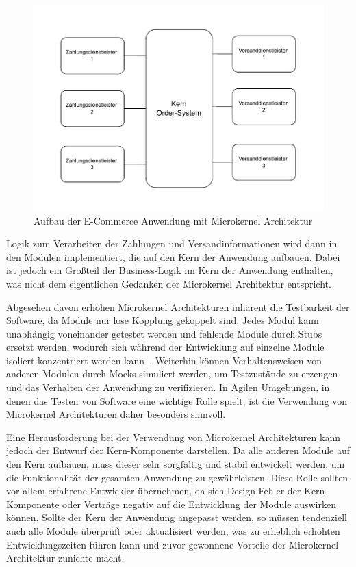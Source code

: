 \documentclass[acmtog]{acmart}
\begin{document}
\begin{figure}[!h]
  \centering
  \includegraphics[width=\linewidth]{images/microkernel/ecommerce-mikrokernel}
  \caption{Aufbau der E-Commerce Anwendung mit Microkernel Architektur}
  \label{fig:ecommerce-microkernel}
\end{figure}

Logik zum Verarbeiten der Zahlungen und Versandinformationen wird dann in den Modulen implementiert, die auf den Kern der Anwendung aufbauen.
Dabei ist jedoch ein Großteil der Business-Logik im Kern der Anwendung enthalten, was nicht dem eigentlichen Gedanken der Microkernel Architektur entspricht.

Abgesehen davon erhöhen Microkernel Architekturen inhärent die Testbarkeit der Software, da Module nur lose Kopplung gekoppelt sind.
Jedes Modul kann unabhängig voneinander getestet werden und fehlende Module durch Stubs ersetzt werden, wodurch sich während der Entwicklung auf einzelne Module isoliert konzentriert werden kann~\cite[26]{architecturePatterns}.
Weiterhin können Verhaltensweisen von anderen Modulen durch Mocks simuliert werden, um Testzustände zu erzeugen und das Verhalten der Anwendung zu verifizieren.
In Agilen Umgebungen, in denen das Testen von Software eine wichtige Rolle spielt, ist die Verwendung von Microkernel Architekturen daher besonders sinnvoll.

Eine Herausforderung bei der Verwendung von Microkernel Architekturen kann jedoch der Entwurf der Kern-Komponente darstellen.
Da alle anderen Module auf den Kern aufbauen, muss dieser sehr sorgfältig und stabil entwickelt werden, um die Funktionalität der gesamten Anwendung zu gewährleisten.
Diese Rolle sollten vor allem erfahrene Entwickler übernehmen, da sich Design-Fehler der Kern-Komponente oder Verträge negativ auf die Entwicklung der Module auswirken können.
Sollte der Kern der Anwendung angepasst werden, so müssen tendenziell auch alle Module überprüft oder aktualisiert werden, was zu erheblich erhöhten Entwicklungszeiten führen kann und zuvor gewonnene Vorteile der Microkernel Architektur zunichte macht.
\end{document}

